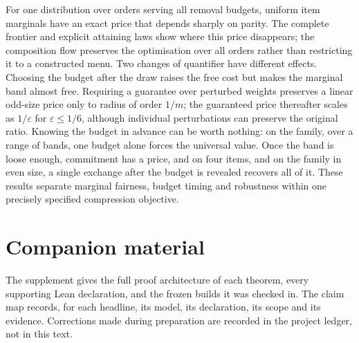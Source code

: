 For one distribution over orders serving all removal budgets, uniform item marginals have
an exact price that depends sharply on parity. The complete frontier and explicit attaining
laws show where this price disappears; the composition flow preserves the optimisation over
all orders rather than restricting it to a constructed menu. Two changes of quantifier have
different effects. Choosing the budget after the draw raises the free cost but makes the
marginal band almost free. Requiring a guarantee over perturbed weights preserves a linear
odd-size price only to radius of order $1/m$; the guaranteed price thereafter scales as
$1/\varepsilon$ for $\varepsilon\le1/6$, although individual perturbations can preserve the original ratio.
Knowing the budget in advance can be worth nothing: on the family, over a range of bands, one
budget alone forces the universal value. Once the band is loose enough, commitment has a price,
and on four items, and on the family in even size, a single exchange after the budget is
revealed recovers all of it.
These results separate marginal fairness, budget timing and robustness within one precisely
specified compression objective.

\section*{Companion material}
The supplement gives the full proof architecture of each theorem, every supporting Lean
declaration, and the frozen builds it was checked in. The claim map records, for each
headline, its model, its declaration, its scope and its evidence. Corrections made during
preparation are recorded in the project ledger, not in this text.

